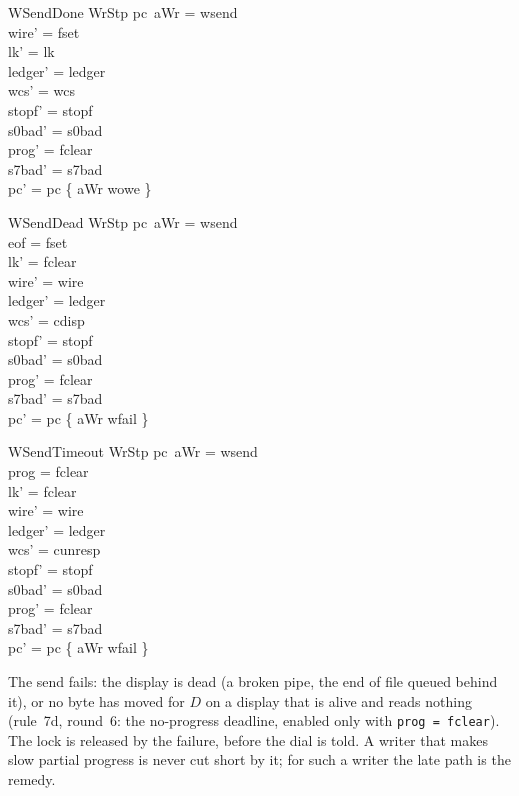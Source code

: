 \documentclass[a4paper,10pt,fleqn]{article}
\begin{document}
\begin{schema}{WSendDone}
  WrStp
\where
  pc~aWr = wsend \\
  wire' = fset \\
  lk' = lk \\
  ledger' = ledger \\
  wcs' = wcs \\
  stopf' = stopf \\
  s0bad' = s0bad \\
  prog' = fclear \\
  s7bad' = s7bad \\
  pc' = pc \oplus \{ aWr \mapsto wowe \}
\end{schema}

\begin{schema}{WSendDead}
  WrStp
\where
  pc~aWr = wsend \\
  eof = fset \\
  lk' = fclear \\
  wire' = wire \\
  ledger' = ledger \\
  wcs' = cdisp \\
  stopf' = stopf \\
  s0bad' = s0bad \\
  prog' = fclear \\
  s7bad' = s7bad \\
  pc' = pc \oplus \{ aWr \mapsto wfail \}
\end{schema}

\begin{schema}{WSendTimeout}
  WrStp
\where
  pc~aWr = wsend \\
  prog = fclear \\
  lk' = fclear \\
  wire' = wire \\
  ledger' = ledger \\
  wcs' = cunresp \\
  stopf' = stopf \\
  s0bad' = s0bad \\
  prog' = fclear \\
  s7bad' = s7bad \\
  pc' = pc \oplus \{ aWr \mapsto wfail \}
\end{schema}

The send fails: the display is dead (a broken pipe, the end of file queued
behind it), or no byte has moved for $D$ on a display that is alive and reads
nothing (rule~7d, round~6: the no-progress deadline, enabled only with
\texttt{prog = fclear}).  The lock is released by the failure, before the dial
is told.  A writer that makes slow partial progress is never cut short by it;
for such a writer the late path is the remedy.
\end{document}
